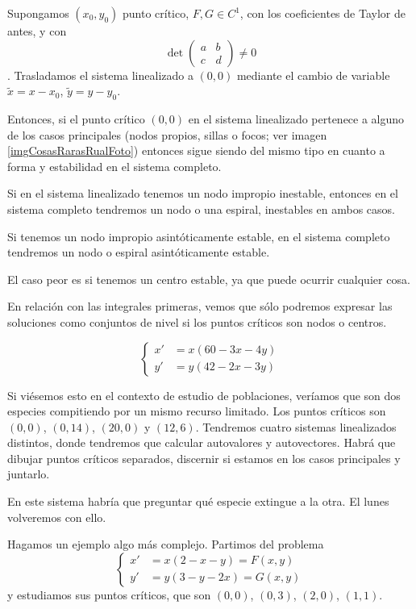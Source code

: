 \begin{theorem} Supongamos $(x_0, y_0)$ punto crítico, $F, G∈C^1$, con los coeficientes de Taylor de antes, y con \[ \det \begin{pmatrix}
a & b \\ c & d
\end{pmatrix} ≠ 0 \]. Trasladamos el sistema linealizado a $(0,0)$ mediante el cambio de variable $\tilde{x} = x - x_0$, $\tilde{y}= y-y_0$.

Entonces, si el punto crítico $(0,0)$ en el sistema linealizado pertenece a alguno de los casos principales (nodos propios, sillas o focos; ver imagen \ref{imgCosasRarasRualFoto}) entonces sigue siendo del mismo tipo en cuanto a forma y estabilidad en el sistema completo.

Si en el sistema linealizado tenemos un nodo impropio inestable, entonces en el sistema completo tendremos un nodo o una espiral, inestables en ambos casos.

Si tenemos un nodo impropio asintóticamente estable, en el sistema completo tendremos un nodo o espiral asintóticamente estable.

El caso peor es  si tenemos un centro estable, ya que puede ocurrir cualquier cosa.
\end{theorem}

En relación con las integrales primeras, vemos que sólo podremos expresar las soluciones como conjuntos de nivel si los puntos críticos son nodos o centros.

\begin{example}
\[\begin{cases}
x' &= x(60-3x-4y) \\
y' &= y(42-2x-3y)
\end{cases} \]

Si viésemos esto en el contexto de estudio de poblaciones, veríamos que son dos especies compitiendo por un mismo recurso limitado. Los puntos críticos son $(0,0)$, $\left(0, 14\right)$, $(20, 0)$ y $(12, 6)$. Tendremos cuatro sistemas linealizados distintos, donde tendremos que calcular autovalores y autovectores. Habrá que dibujar puntos críticos separados, discernir si estamos en los casos principales y juntarlo.

En este sistema habría que preguntar qué especie extingue a la otra. El lunes volveremos con ello.
\end{example}


Hagamos un ejemplo algo más complejo. Partimos del problema \[ \begin{cases} x' &= x(2-x-y) = F(x,y) \\ y' &= y(3-y-2x) = G(x,y) \end{cases} \] y estudiamos sus puntos críticos, que son $(0,0)$, $(0,3)$, $(2,0)$, $(1,1)$.


